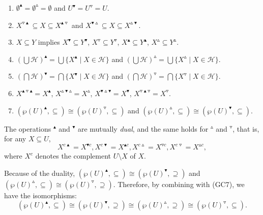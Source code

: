 \documentclass[11pt,a4paper]{amsart}
\newcommand{\UP}{\blacktriangle}
\newcommand{\DOWN}{\blacktriangledown}
\newcommand{\Up}{\vartriangle}
\newcommand{\Down}{\triangledown}
\theoremstyle{plain}
\theoremstyle{definition}
\theoremstyle{remark}
\numberwithin{equation}{section}
\begin{document}
\begin{enumerate}[label={\rm (GC\arabic*)}]
    \item $\emptyset^\UP = \emptyset^\Up = \emptyset$ and
    $U^\DOWN = U^\Down = U$.
    \item $X^{\Down\UP} \subseteq X \subseteq X^{\UP\Down}$ and
    $X^{\DOWN\Up} \subseteq X \subseteq X^{\Up\DOWN}$.
    \item $X \subseteq Y$ implies $X^\DOWN \subseteq Y^\DOWN$, 
    $X^\Down \subseteq Y^\Down$, $X^\UP \subseteq Y^\UP$, 
    $X^\Up \subseteq Y^\Up$.
    \item $(\bigcup \mathcal{H})^\UP = 
    \bigcup \{X^\UP \mid X \in \mathcal{H}\}$
    and 
    $(\bigcup \mathcal{H})^\Up = \bigcup\{X^\Up \mid X \in \mathcal{H}\}$.
    \item $(\bigcap \mathcal{H})^\DOWN = 
    \bigcap \{X^\DOWN \mid X \in \mathcal{H}\}$
    and 
    $(\bigcap \mathcal{H})^\Down = \bigcap\{X^\Down \mid X \in \mathcal{H}\}$.
    \item $X^{\UP \Down \UP} = X^\UP$,
    $X^{\Up \DOWN \Up} = X^\Up$,
    $X^{\DOWN \Up \DOWN} = X^\DOWN$,
    $X^{\Down \UP \Down} = X^\Down$.
    \item $(\wp(U)^\UP,\subseteq) \cong (\wp(U)^\Down,\subseteq)$
     and 
    $(\wp(U)^\Up,\subseteq) \cong (\wp(U)^\DOWN,\subseteq)$.
\end{enumerate}
The operations $^\UP$ and $^\DOWN$ are mutually \emph{dual}, and the same holds for $^\Up$ and $^\Down$, that is, 
for any $X \subseteq U$,
\begin{equation} \label{eq:dual}
X^{c \UP} = X^{\DOWN c},
X^{c \DOWN} = X^{\UP c},
X^{c \Up} = X^{\Down c}, 
X^{c \Down} = X^{\Up c},
\end{equation}
where $X^c$ denotes the complement $U \setminus X$ of $X$. 

Because of the duality, $(\wp(U)^\UP,\subseteq) \cong (\wp(U)^\DOWN,\supseteq)$
and $(\wp(U)^\Up,\subseteq) \cong (\wp(U)^\Down,\supseteq)$. Therefore, by combining with (GC7), 
we have the isomorphisms: 
\begin{equation}\label{eq:isomorphisms}
(\wp(U)^\UP,\subseteq) \cong (\wp(U)^\DOWN,\supseteq) \cong
(\wp(U)^\Up,\supseteq) \cong (\wp(U)^\Down,\subseteq).
\end{equation}
\end{document}

